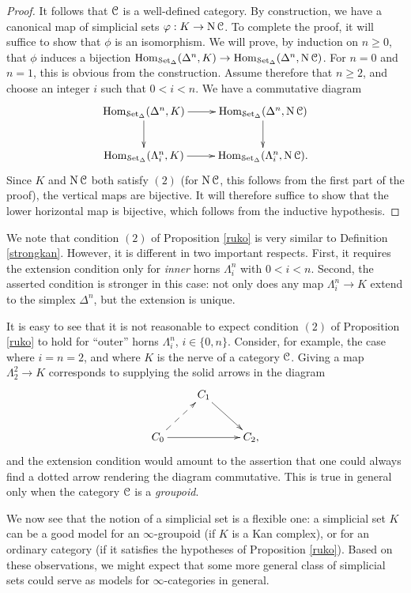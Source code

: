\begin{1.1.2 inf-Categories}
\begin{proof}
It follows that $\operatorname{\mathcal{C}}$ is a well-defined category. By construction, we have a canonical
map of simplicial sets $\varphi: K \rightarrow \operatorname{N} \operatorname{\mathcal{C}}$. To complete the proof, it will suffice
to show that $\phi$ is an isomorphism. We will prove, by induction on
$n \geq 0$, that $\phi$ induces a bijection $\operatorname{Hom}_{ \operatorname{\mathcal{S}et_{\Delta}}}( \Delta^n, K) \rightarrow
\operatorname{Hom}_{\operatorname{\mathcal{S}et_{\Delta}}}( \Delta^n, \operatorname{N} \operatorname{\mathcal{C}})$. For $n=0$ and $n=1$, this is obvious from
the construction. Assume therefore that $n \geq 2$, and choose an integer $i$ such
that $0 < i < n$. We have a commutative diagram
$$ \xymatrix{ \Hom_{\sSet}( \Delta^n, K ) \ar[r] \ar[d] & \Hom_{\sSet}( \Delta^n, \Nerve \calC) \ar[d] \\
\Hom_{ \sSet}( \Lambda^n_i, K) \ar[r] & \Hom_{\sSet}( \Lambda^n_i, \Nerve \calC ). }$$
Since $K$ and $\operatorname{N} \operatorname{\mathcal{C}}$ both satisfy $(2)$ (for $\operatorname{N} \operatorname{\mathcal{C}}$, this follows
from the first part of the proof), the vertical maps are bijective. It will therefore suffice to show that the lower horizontal map is bijective, which follows from the inductive hypothesis.
\end{proof}

We note that condition $(2)$ of Proposition \ref{ruko} is very similar to Definition \ref{strongkan}. However, it is different in two important respects. First, it requires the extension condition only for {\em inner} horns $\Lambda^n_i$ with $0 < i < n$. Second, the asserted condition is stronger in this case: not only does any map $\Lambda^n_i \rightarrow K$ extend to the simplex $\Delta^n$, but the extension is unique.

\begin{remark}\label{nottes}
It is easy to see that it is not reasonable to expect condition $(2)$ of Proposition \ref{ruko} to hold for ``outer'' horns $\Lambda^n_i$, $i \in \{0,n\}$. Consider, for example, the case where $i=n=2$, and where $K$ is the nerve of a category $\operatorname{\mathcal{C}}$. Giving a map $\Lambda^2_2 \rightarrow K$
corresponds to supplying the solid arrows in the diagram
$$ \xymatrix{ & C_1 \ar[dr] & \\
C_0 \ar[rr] \ar@{-->}[ur] & & C_2,} $$
and the extension condition would amount to the assertion that one could always find a dotted arrow rendering the diagram commutative. This is true in general only when the category $\operatorname{\mathcal{C}}$ is a {\em groupoid}.
\end{remark}

We now see that the notion of a simplicial set is a flexible one: a simplicial set $K$ can be a good model for an $\infty$-groupoid (if $K$ is a Kan complex), or for an ordinary category (if it satisfies the hypotheses of Proposition \ref{ruko}). Based on these observations, we might expect that some more general class of simplicial sets could serve as models for $\infty$-categories in general.


\end{1.1.2 inf-Categories}
